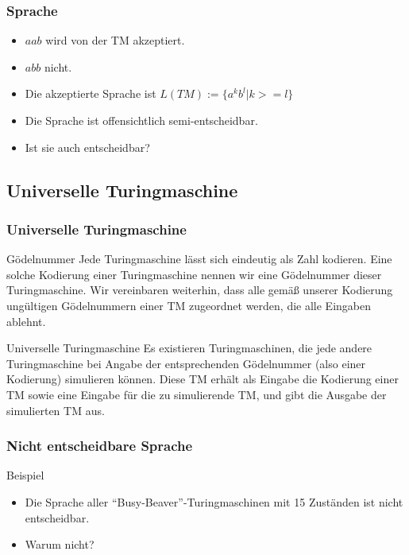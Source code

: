 \documentclass{beamer}
\begin{document}
{\begin{frame}
 \frametitle{Sprache}
 \begin{itemize}
  \item $aab$ wird von der TM akzeptiert.
  \item $abb$ nicht.
  \item Die akzeptierte Sprache ist $L(TM) := \{a^kb^l| k >= l\}$
  \item Die Sprache ist offensichtlich semi-entscheidbar.
  \item Ist sie auch entscheidbar?
 \end{itemize}
\end{frame}



\subsection{Universelle Turingmaschine}
\begin{frame}
\frametitle{Universelle Turingmaschine}
\begin{block}{Gödelnummer}
Jede Turingmaschine lässt sich eindeutig als Zahl kodieren. Eine solche Kodierung einer Turingmaschine nennen wir eine Gödelnummer dieser Turingmaschine. Wir vereinbaren weiterhin, dass alle gemäß unserer Kodierung ungültigen Gödelnummern einer TM zugeordnet werden, die alle Eingaben ablehnt.
\end{block}
\begin{block}{Universelle Turingmaschine}
Es existieren Turingmaschinen, die jede andere Turingmaschine bei Angabe der entsprechenden Gödelnummer (also einer Kodierung) simulieren können. Diese TM erhält als Eingabe die Kodierung einer TM sowie eine Eingabe für die zu simulierende TM, und gibt die Ausgabe der simulierten TM aus.
\end{block}
\end{frame}

\begin{frame}
 \frametitle{Nicht entscheidbare Sprache}
 \begin{block}{Beispiel}
 \begin{itemize}
  \item Die Sprache aller ``Busy-Beaver''-Turingmaschinen mit 15 Zuständen ist nicht entscheidbar.
  \item Warum nicht?
 \end{itemize}
 \end{block}
\end{frame}

}
\end{document}
